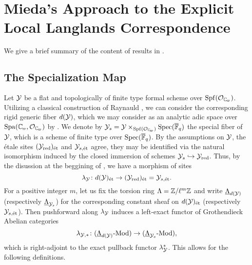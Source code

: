 \documentclass[../main.tex]{subfiles}
\begin{document}
\section{Mieda's Approach to the Explicit Local Langlands Correspondence} %
\label{sec:Mieda's Approach to the Explicit Local Langlands Correspondence}

We give a brief summary of the content of results in \cite{mieda2016geometric}.

\subsection{The Specialization Map} %
\label{sub:The Injectivity FinLevel}
Let $\mathcal{Y}$ be a flat and topologically of finite type formal scheme over $\Spf(\cO_\Cp)$.
Utilizing a classical construction of Raynauld \cite{raynaud1974geometrie}, we 
can consider the corresponding rigid generic fiber $d(\mathcal{Y})$, which we may
consider as an analytic adic space over $\Spa(\Cp,\cO_\Cp)$ by \cite[Section
1.9]{huber2013etale}. We denote by $\cY_s = \cY \times_{\Spf(\cO_\Cp)} \spec
(\Fqbar)$ the special fiber of $\mathcal{Y}$, which is a scheme of finite type over $\operatorname{Spec}(
{\overline {\mathbb{F}}_q})$. By the assumptions on $\mathcal{Y}$, the \'etale sites $(\mathcal{Y}_{\mathrm{red}})_{\textnormal{\'et}}$ and
$\mathcal{Y}_{s,\textnormal{\'et}}$ agree, they may be identified via the natural isomorphism induced
by the closed immersion of schemes $\mathcal{Y}_s \hookrightarrow \mathcal{Y}_{\mathrm{red}}$. Thus, by the
disussion at the beggining of \cite[Section 3.5]{huber2013etale}, we have a
morphism of sites
\begin{equation*}
  \lambda_{\mathcal{Y}} \colon d(\mathcal{Y})_{\textnormal{\'et}} \to (\mathcal{Y}_{\mathrm{red}})_{\textnormal{\'et}} = \mathcal{Y}_{s, \textnormal{\'et}}.
\end{equation*}
For a positive integer $m$, let us fix the torsion ring $\Lambda = \mathbb{Z}/\ell^m
\mathbb{Z}$ and write $\underline \Lambda_{d(\mathcal{Y})}$ (respectively $\underline
\Lambda_{\mathcal{Y}_{s}}$)
for the corresponding constant sheaf on $d(\mathcal{Y})_{\textnormal{\'et}}$ (respectively $\mathcal{Y}_{s,\textnormal{\'et}}$). Then 
pushforward along $\lambda_{\mathcal{Y}}$ induces a left-exact functor of Grothendieck
Abelian categories
\begin{equation*}
  \lambda_{\mathcal{Y},*}\colon {({\underline \Lambda_{d(\mathcal{Y})}}\textnormal-\allowbreak\mathrm{Mod})} \to {({\underline \Lambda_{\mathcal{Y}_{s}}}\textnormal-\allowbreak\mathrm{Mod})},
\end{equation*}
which is right-adjoint to the exact pullback functor $\lambda_{\mathcal{Y}}^*$.
This allows for the following definitions.
\end{document}
